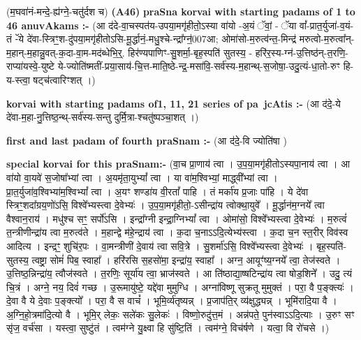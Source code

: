 \documentclass[17pt]{extarticle}
\begin{document}
                  \newline
                      (म॒घवा॑नं-मन्दे॒-ह्य॑ग्ने॒-चतु॑र्दश च)  \textbf{(A46)} \newline \newline
                \textbf{praSna korvai with starting padams of 1 to 46 anuvAkams :-} \newline
        (आ द॑दे-वा॒चस्पत॑य-उपया॒मगृ॑हीतो॒ऽस्या वा॑यो -अ॒यं ॅवां॒ - ॅया वां᳚-प्रात॒र्युजा॑-व॒यं-तं -ॅये दे॑वा-स्त्रिꣳ॒॒श-दु॑पया॒मगृ॑हीतोऽसि-मू॒र्द्धानं॒-मधु॒श्चे-न्द्रा᳚ग्न॒॑007आ; ओमा॑सो-म॒रुत्व॑न्त॒-मिन्द्र॑ मरुत्वो-म॒रुत्वा᳚न्- म॒हान्-म॒हान्नु॒वत्-क॒दा-वा॒म-मद॑ब्धेभि॒र्॒. हिर॑ण्यपाणिꣳ-सु॒शर्मा॒-बृह॒स्पति॑ सुतस्य॒ - हरि॑र॒स्य-ग्न॑-उ॒त्तिष्ठ॑न्-त॒रणि॒- राप्या॑यस्वे॒-युष्टे ये-ज्योति॑ष्मतीं-प्रया॒साय॑-चि॒त्त-माति॒ष्ठे-न्द्र॒-मसा॑वि॒-सर्व॑स्य-म॒हान्थ्-स॒जोषा॒-उदु॒त्यं-धा॒तो-रुꣳ हि-य-स्त्वा॒ षट्च॑त्वारिꣳशत् ।) \newline

        \textbf{korvai with starting padams of1, 11, 21 series of pa~jcAtis :-} \newline
        (आ द॑दे॒-ये दे॑वा-म॒हा-नु॒त्तिष्ठ॒न्थ्-सर्व॑स्य-सन्तु दुर्मि॒त्रा-श्चतु॑ष्पञ्चा॒शत् ।) \newline

        \textbf{first and last padam of fourth praSnam :-} \newline
        (आ द॑दे॒-वि ज्योति॑षा ) \newline 

                    \textbf{special korvai for this praSnam:-} \newline
            (वा॒च प्रा॒णाय॑ त्वा । उ॒प॒या॒मगृ॑हीतोऽस्यपा॒नाय॑ त्वा । आ वा॑यो वा॒यवे॑ स॒जोषा᳚भ्यां त्वा । अ॒यमृ॑ता॒युभ्यां᳚ त्वा । या वा॑म॒श्विभ्यां॒ माद्ध्वी᳚भ्यां त्वा । प्रा॒त॒र्युजा॑व॒श्विभ्या॑म॒श्विभ्यां᳚ त्वा । अ॒यꣳ शण्डा॑य वी॒रतां᳚ पाहि । तं मर्का॑य प्र॒जाः पा॑हि । ये दे॑वा स्त्रिꣳ॒॒शदा᳚ग्रय॒णो॑ऽसि॒ विश्वे᳚भ्यस्त्वा दे॒वेभ्यः॑ । उ॒प॒या॒मगृ॑हीतो॒-ऽसीन्द्रा॑य त्वोक्था॒युवे᳚ । मू॒र्द्धान॑म॒ग्नये᳚ त्वा वैश्वान॒राय॑ । मधु॑श्च सꣳ॒॒ सर्पो॑ऽसि । इन्द्रा᳚ग्नी इन्द्रा॒ग्निभ्यां᳚ त्वा । ओमा॑सो॒ विश्वे᳚भ्यस्त्वा दे॒वेभ्यः॑ । म॒रुत्वं॑ त॒न्त्रीणीन्द्रा॑य त्वा म॒रुत्व॑ते । म॒हान्द्वे म॑हे॒न्द्राय॑ त्वा । क॒दा च॒नाऽऽदि॒त्येभ्य॑स्त्वा । क॒दा च॒न स्त॒रीर् विव॑स्व आदित्य । इन्द्रꣳ॒॒ शुचि॑र॒पः । वा॒मन्त्रीणी॑ दे॒वाय॑ त्वा सवि॒त्रे । सु॒शर्मा॑ऽसि॒ विश्वे᳚भ्यस्त्वा दे॒वेभ्यः॑ । बृह॒स्पति॑-सुतस्य॒ त्वष्ट्रा॒ सोमं॑ पिब॒ स्वाहा᳚ । हरि॑रसि स॒हसो॑मा॒ इन्द्रा॑य॒ स्वाहा᳚ । अग्न॒ आयूꣳ॑ष्य॒ग्नये᳚ त्वा॒ तेज॑स्वते । उ॒त्तिष्ठ॒न्निन्द्रा॑य॒ त्वौज॑स्वते । त॒रणिः॒ सूर्या॑य त्वा॒ भ्राज॑स्वते । आ ति॑ष्ठाद्या॒ष्षटिन्द्रा॑य त्वा षोड॒शिने᳚ । उदु॒ त्यं चि॒त्रं । अग्ने॒ नय॒ दिवं॑ गच्छ । उ॒रूमायु॑ष्टे॒ यद्दे॑वा मुमुग्धि । अग्ना॑विष्णू सुक्रतू मुमुक्तं । परा॒ वै प॒ङ्क्त्यः॑ । दे॒वा वै ये दे॒वाः प॒ङ्क्त्यो᳚ । परा॒ वै स वाचं᳚ । भूमि॒र्व्य॑तृष्यन्न् । प्र॒जाप॑ति॒र् व्य॑क्षुद्ध्यन्न् । भूमि॑रादि॒या वै । अ॒ग्नि॒हो॒त्रमा॑दि॒त्यो वै । भूमि॒र् लेकः॒ सले॑कः सु॒लेकः॑ । विष्णो॒रुदु॑त्त॒मं । अन्न॑पते॒ पुन॑स्वाऽऽदि॒त्याः । उ॒रुꣳ सꣳ सृ॑ज॒ वर्च॑सा । यस्त्वा॒ सुष्टु॑तं । त्वम॑ग्ने यु॒क्ष्वा हि सु॑ष्टि॒तिं । त्वम॑ग्ने॒ विच॑र्षणे । यत्वा॒ वि रो॑चसे ।) \newline
        
\end{document}
